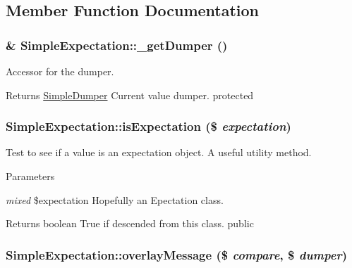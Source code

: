 \subsection{Member Function Documentation}
\hypertarget{class_simple_expectation_aed678acaf449c68f660730cefe4173c3}{
\subsubsection[{\_\-getDumper}]{\setlength{\rightskip}{0pt plus 5cm}\& SimpleExpectation::\_\-getDumper ()}}
\label{class_simple_expectation_aed678acaf449c68f660730cefe4173c3}
Accessor for the dumper. \begin{DoxyReturn}{Returns}
\hyperlink{class_simple_dumper}{SimpleDumper} Current value dumper.  protected 
\end{DoxyReturn}
\hypertarget{class_simple_expectation_aa8d65472c1475069b18f5cb968c31aca}{
\subsubsection[{isExpectation}]{\setlength{\rightskip}{0pt plus 5cm}SimpleExpectation::isExpectation (\$ {\em expectation})}}
\label{class_simple_expectation_aa8d65472c1475069b18f5cb968c31aca}
Test to see if a value is an expectation object. A useful utility method. 
\begin{DoxyParams}{Parameters}
\item[{\em mixed}]\$expectation Hopefully an Epectation class. \end{DoxyParams}
\begin{DoxyReturn}{Returns}
boolean True if descended from this class.  public 
\end{DoxyReturn}
\hypertarget{class_simple_expectation_afa9eddaa1f6818c6a3a6a89e3a36468a}{
\subsubsection[{overlayMessage}]{\setlength{\rightskip}{0pt plus 5cm}SimpleExpectation::overlayMessage (\$ {\em compare}, \/  \$ {\em dumper})}}
